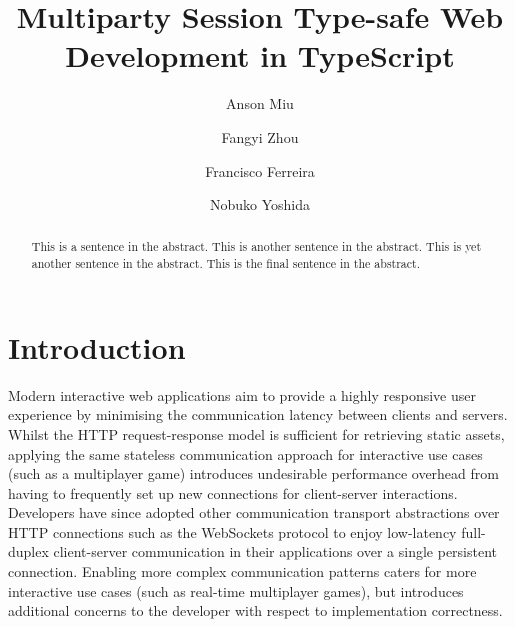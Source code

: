 \documentclass[submission,copyright,creativecommons]{eptcs}
\title{Multiparty Session Type-safe Web Development in TypeScript}
\author{Anson Miu
\institute{Imperial College London}
\and
Fangyi Zhou
\institute{Imperial College London}
\and
Francisco Ferreira
\institute{Imperial College London}
\and
Nobuko Yoshida
\institute{Imperial College London}
}
\begin{document}
\maketitle

\begin{abstract}



This is a sentence in the abstract.
This is another sentence in the abstract.
This is yet another sentence in the abstract.
This is the final sentence in the abstract.





\end{abstract}

\section{Introduction}

Modern interactive web applications aim to provide a highly responsive user experience by minimising the communication latency between clients and servers. 
Whilst the HTTP request-response model is sufficient for retrieving static assets, applying the same stateless communication approach for interactive use cases (such as a multiplayer game) introduces undesirable performance overhead from having to frequently set up new connections for client-server interactions. 
Developers have since adopted other communication transport abstractions over HTTP connections such as the WebSockets protocol \cite{WebSocketRFC} to enjoy low-latency full-duplex client-server communication in their applications over a single persistent connection. 
Enabling more complex communication patterns caters for more interactive use cases (such as real-time multiplayer games), but introduces additional concerns to the developer with respect to implementation correctness.
\end{document}
